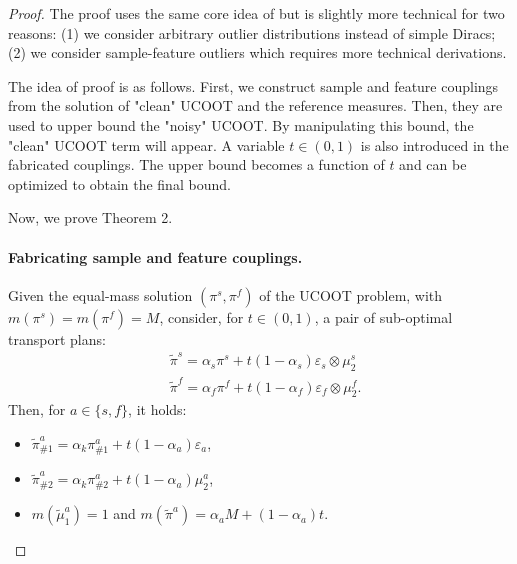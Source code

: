   \begin{proof}
    The proof uses the same core idea of \citep{Fatras21} but is slightly more technical
    for two reasons: (1) we consider arbitrary outlier distributions instead of simple Diracs;
    (2) we consider sample-feature outliers which requires more technical derivations.

    The idea of proof is as follows. First, we construct sample and feature couplings
    from the solution of "clean" UCOOT and the reference measures. Then, they are used to
    upper bound the "noisy" UCOOT. By manipulating this bound, the "clean" UCOOT term will appear.
    A variable $t \in (0,1)$ is also introduced in the fabricated couplings.
    The upper bound becomes a function of $t$ and can be optimized to obtain the final bound.

    Now, we prove Theorem 2.

    \paragraph{Fabricating sample and feature couplings.}
    Given the equal-mass solution $(\pi^s, \pi^f)$ of the UCOOT problem,
    with $m(\pi^s) = m(\pi^f) = M$, consider, for $t \in (0,1)$, a pair of
    sub-optimal transport plans:
    \begin{align*}
      &\widetilde{\pi}^s = \alpha_s \pi^s + t (1-\alpha_s) \varepsilon_s \otimes \mu^s_2\\
      &\widetilde{\pi}^f = \alpha_f \pi^f + t (1-\alpha_f) \varepsilon_f \otimes \mu^f_2.
    \end{align*}
    Then, for $a\in \{s, f\}$, it holds:
    \begin{itemize}
      \item $\widetilde{\pi}^a_{\#1} = \alpha_k \pi^a_{\#1} + t (1 - \alpha_a) \varepsilon_a$,
      \item $\widetilde{\pi}^a_{\#2} = \alpha_k \pi^a_{\#2} + t (1 - \alpha_a) \mu^a_2$,
      \item $m(\widetilde{\mu}^a_1) = 1$ and $m(\widetilde{\pi}^a) = \alpha_a M + (1-\alpha_a) t$.
    \end{itemize}

\end{proof}
